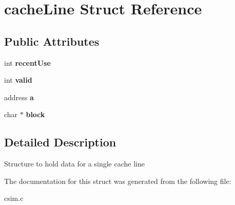 \hypertarget{structcacheLine}{}\section{cache\+Line Struct Reference}
\label{structcacheLine}
\subsection*{Public Attributes}
\begin{DoxyCompactItemize}
\item 
\mbox{\label{structcacheLine_ab7effab1bc6d0bcd06fd90f175d71bfc}} 
int {\bfseries recent\+Use}
\item 
\mbox{\label{structcacheLine_a8fb94b95627b6b2fc4ab6d2b053599ab}} 
int {\bfseries valid}
\item 
\mbox{\label{structcacheLine_add4fe561e1eec8180f274bb6eb742f79}} 
address {\bfseries a}
\item 
\mbox{\label{structcacheLine_a25f8470d1617dfa07025ba6376bce1f7}} 
char $\ast$ {\bfseries block}
\end{DoxyCompactItemize}


\subsection{Detailed Description}
Structure to hold data for a single cache line 

The documentation for this struct was generated from the following file\+:\begin{DoxyCompactItemize}
\item 
csim.\+c\end{DoxyCompactItemize}
